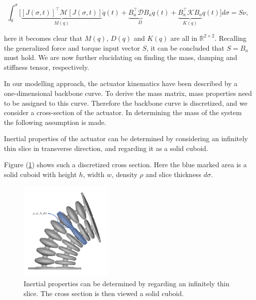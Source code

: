 \begin{equation}
    \int_0^\sigma \Big[ \underbrace{[J(\sigma,t)]^\top \mathcal{M} [J(\sigma,t)]}_{M(q)} \ddot{q}(t) +  \underbrace{B_a^\top \mathcal{D} B_a }_{D} \dot{q}(t)    +   \underbrace{B_a^\top \mathcal{K} B_a}_{K(q)} q(t)\Big] d\sigma = S\nu,
\end{equation}

here it becomes clear that $M(q)$, $D(q)$ and $K(q)$ are all in $\mathbb{R}^{2\times2}$. Recalling the generalized force and torque input vector $S$, it can be concluded that $S = B_a$ must hold. We are now further elucidating on finding the mass, damping and stiffness tensor, respectively.

In our modelling approach, the actuator kinematics have been described by a one-dimensional backbone curve. To derive the mass matrix, mass properties need to be assigned to this curve. Therefore the backbone curve is discretized, and we consider a cross-section of the actuator. In determining the mass of the system the following assumption is made.

\begin{theorem}
Inertial properties of the actuator can be determined by considering an infinitely thin slice in transverse direction, and regarding it as a solid cuboid.
\end{theorem}

Figure (\ref{fig:massapprox}) shows such a discretized cross section. Here the blue marked area is a solid cuboid with height $h$, width $w$, density $\rho$ and slice thickness $d\sigma$. 


\begin{figure}[H]
    \centering
    \includegraphics[width = 0.4\textwidth]{Figures/Chapter2/massapprox.png}
    \caption{Inertial properties can be determined by regarding an infinitely thin slice. The cross section is then viewed a solid cuboid.}
    \label{fig:massapprox}
\end{figure}



